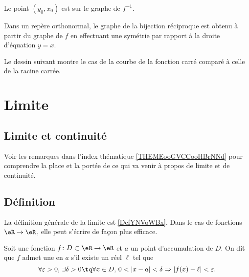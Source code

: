         Le point \( (y_0,x_0)\) est sur le graphe de \( f^{-1}\).

\begin{Aretenir}
    Dans un repère orthonormal, le graphe de la bijection réciproque est obtenu à partir du graphe de \( f\) en effectuant une symétrie par rapport à la droite d'équation \( y=x\).
\end{Aretenir}

Le dessin suivant montre le cas de la courbe de la fonction carré comparé à celle de la racine carrée.
\begin{center}
   
\end{center}

\section{Limite}

\subsection{Limite et continuité}

Voir les remarques dans l'index thématique \ref{THEMEooGVCCooHBrNNd} pour comprendre la place et la portée de ce qui va venir à propos de limite et de continuité.


\subsection{Définition}

La définition générale de la limite est \ref{DefYNVoWBx}. Dans le cas de fonctions \( \eR\to \eR\), elle peut s'écrire de façon plus efficace.

\begin{proposition}       \label{PropAJQQooQQClfp}
	Soit une fonction $f\colon D\subset\eR\to \eR$ et $a$ un point d'accumulation de $D$. On dit que $f$ admet une  en $a$ s'il existe un réel $\ell$ tel que 
	\begin{equation}\label{EqDefLimiteFonction}
		\forall\varepsilon>0,\,\exists\delta>0\tq \forall x\in D,\, 0<| x-a |<\delta\Rightarrow| f(x)-\ell |<\varepsilon.
	\end{equation}
\end{proposition}

